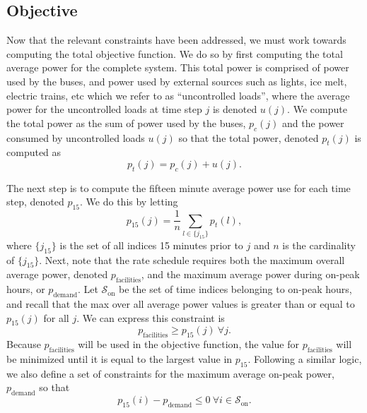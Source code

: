 \subsection{Objective\label{sec:objective}}
\par Now that the relevant constraints have been addressed, we must work towards computing the total objective function. We do so by first computing the total average power for the complete system. This total power is comprised of power used by the buses, and power used by external sources such as lights, ice melt, electric trains, etc which we refer to as ``uncontrolled loads'', where the average power for the uncontrolled loads at time step $j$ is denoted $u(j)$. We compute the total power as the sum of power used by the buses, $p_c(j)$ and the power consumed by uncontrolled loads $u(j)$ so that the total power, denoted $p_t(j)$ is computed as 
\begin{equation}\label{eqn:objective:pt}
	p_t(j) = p_c(j) + u(j).
\end{equation}
\par The next step is to compute the fifteen minute average power use for each time step, denoted $p_{\text{15}}$. We do this by letting 
\begin{equation}\label{eqn:objective:p15}
p_{\text{15}}(j) = \frac{1}{n}\sum_{l \in \{j_{15}\}}p_t(l),
\end{equation}
where $\{j_{15}\}$ is the set of all indices 15 minutes prior to $j$ and $n$ is the cardinality of $\{j_{15}\}$.
Next, note that the rate schedule requires both the maximum overall average power, denoted $p_{\text{facilities}}$, and the maximum average power during on-peak hours, or $p_{\text{demand}}$. Let $\mathcal{S}_{\text{on}}$ be the set of time indices belonging to on-peak hours, and recall that the max over all average power values is greater than or equal to $p_{15}(j)$ for all $j$. We can express this constraint is
\begin{equation}\label{eqn:objective:pFac}
	p_{\text{facilities}} \ge p_{15}(j) \ \forall j.
\end{equation}
Because $p_{\text{facilities}}$ will be used in the objective function, the value for $p_{\text{facilities}}$ will be minimized until it is equal to the largest value in $p_{15}$. Following a similar logic, we also define a set of constraints for the maximum average on-peak power, $p_{\text{demand}}$ so that
\begin{equation}\label{eqn:objective:pDem}
	p_{15}(i) - p_{\text{demand}} \le 0 \ \forall i \in \mathcal{S}_{\text{on}}.
\end{equation}
